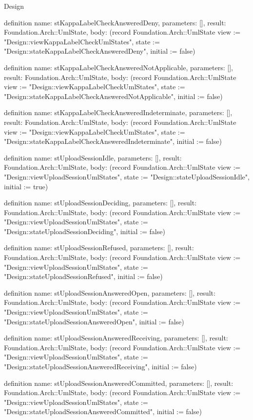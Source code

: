 \begin{lexlean}{Design}
\begin{semanticmodule}
definition{
  name: stKappaLabelCheckAnsweredDeny,
  parameters: [],
  result: Foundation.Arch::UmlState,
  body: (record Foundation.Arch::UmlState {view := "Design::viewKappaLabelCheckUmlStates", state := "Design::stateKappaLabelCheckAnsweredDeny", initial := false})
}

definition{
  name: stKappaLabelCheckAnsweredNotApplicable,
  parameters: [],
  result: Foundation.Arch::UmlState,
  body: (record Foundation.Arch::UmlState {view := "Design::viewKappaLabelCheckUmlStates", state := "Design::stateKappaLabelCheckAnsweredNotApplicable", initial := false})
}

definition{
  name: stKappaLabelCheckAnsweredIndeterminate,
  parameters: [],
  result: Foundation.Arch::UmlState,
  body: (record Foundation.Arch::UmlState {view := "Design::viewKappaLabelCheckUmlStates", state := "Design::stateKappaLabelCheckAnsweredIndeterminate", initial := false})
}

definition{
  name: stUploadSessionIdle,
  parameters: [],
  result: Foundation.Arch::UmlState,
  body: (record Foundation.Arch::UmlState {view := "Design::viewUploadSessionUmlStates", state := "Design::stateUploadSessionIdle", initial := true})
}

definition{
  name: stUploadSessionDeciding,
  parameters: [],
  result: Foundation.Arch::UmlState,
  body: (record Foundation.Arch::UmlState {view := "Design::viewUploadSessionUmlStates", state := "Design::stateUploadSessionDeciding", initial := false})
}

definition{
  name: stUploadSessionRefused,
  parameters: [],
  result: Foundation.Arch::UmlState,
  body: (record Foundation.Arch::UmlState {view := "Design::viewUploadSessionUmlStates", state := "Design::stateUploadSessionRefused", initial := false})
}

definition{
  name: stUploadSessionAnsweredOpen,
  parameters: [],
  result: Foundation.Arch::UmlState,
  body: (record Foundation.Arch::UmlState {view := "Design::viewUploadSessionUmlStates", state := "Design::stateUploadSessionAnsweredOpen", initial := false})
}

definition{
  name: stUploadSessionAnsweredReceiving,
  parameters: [],
  result: Foundation.Arch::UmlState,
  body: (record Foundation.Arch::UmlState {view := "Design::viewUploadSessionUmlStates", state := "Design::stateUploadSessionAnsweredReceiving", initial := false})
}

definition{
  name: stUploadSessionAnsweredCommitted,
  parameters: [],
  result: Foundation.Arch::UmlState,
  body: (record Foundation.Arch::UmlState {view := "Design::viewUploadSessionUmlStates", state := "Design::stateUploadSessionAnsweredCommitted", initial := false})
}


\end{semanticmodule}
\end{lexlean}
